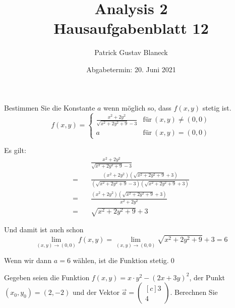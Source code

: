 \documentclass[answers]{exam}
\title{Analysis 2 \\ \large{Hausaufgabenblatt 12}}
\author{Patrick Gustav Blaneck}
\date{Abgabetermin: 20. Juni 2021}
\newcommand{\vektor}[1]{\begin{pmatrix*}[c] #1 \end{pmatrix*}}
\begin{document}
\maketitle
\begin{questions}
    \question
    Bestimmen Sie die Konstante $a$ wenn möglich so, dass $f(x,y)$ stetig ist.
    $$
        f(x, y) = \begin{cases}
            \frac{x^2 + 2y^2}{\sqrt{x^2+2y^2+9} - 3} & \text{für} \ (x, y) \neq (0, 0) \\
            a                                        & \text{für} \ (x, y) = (0, 0)
        \end{cases}
    $$
    \begin{solution}
        Es gilt:
        $$
            \begin{aligned}
                        & \frac{x^2 + 2y^2}{\sqrt{x^2+2y^2+9} - 3}                                                                                                       \\
                = \quad & \frac{\left( x^2 + 2y^2 \right)\left( \sqrt{x^2+2y^2+9} + 3 \right)}{\left( \sqrt{x^2+2y^2+9} - 3 \right)\left( \sqrt{x^2+2y^2+9} + 3 \right)} \\
                = \quad & \frac{\left( x^2 + 2y^2 \right)\left( \sqrt{x^2+2y^2+9} + 3 \right)}{x^2 + 2y^2}                                                               \\
                = \quad & \sqrt{x^2+2y^2+9} + 3
            \end{aligned}
        $$

        Und damit ist auch schon
        $$
            \lim_{(x,y) \to (0, 0)} f(x, y) = \lim_{(x,y) \to (0, 0)} \sqrt{x^2+2y^2+9} + 3 = 6
        $$

        Wenn wir dann $a = 6$ wählen, ist die Funktion stetig.\qed
    \end{solution}

    \newpage
    \question
    Gegeben seien die Funktion $f(x, y) = x\cdot y^2 - (2x+3y)^2$, der Punkt $(x_0, y_0) = (2, -2)$ und der Vektor $\vec{a} = \vektor{3\\4}$.
    Berechnen Sie
\end{questions}
\end{document}
